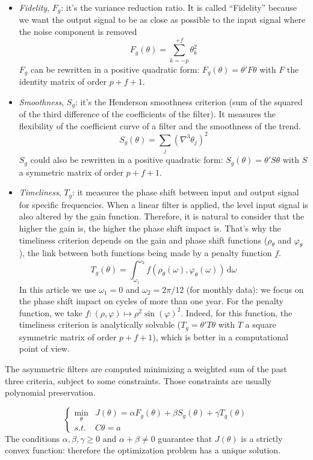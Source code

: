 \documentclass[
  12pt,
  ,
  a4paper]{article}
\newcommand\1{\mathds{1}}
\newcommand\ud{\,\mathrm{d}}
\begin{document}
\begin{itemize}
\item
  \emph{Fidelity}, \(F_g\): it's the variance reduction ratio. It is called ``Fidelity'' because we want the output signal to be as close as possible to the input signal where the noise component is removed
  \[
  F_g(\theta) = \sum_{k=-p}^{+f}\theta_{k}^{2}
  \]
  \(F_g\) can be rewritten in a positive quadratic form: \(F_g(\theta)=\theta'F\theta\) with \(F\) the identity matrix of order \(p+f+1\).
\item
  \emph{Smoothness}, \(S_g\): it's the Henderson smoothness criterion (sum of the squared of the third difference of the coefficients of the filter).
  It measures the flexibility of the coefficient curve of a filter and the smoothness of the trend.
  \[
  S_g(\theta) = \sum_{j}(\nabla^{3}\theta_{j})^{2}
  \]
  \(S_g\) could also be rewritten in a positive quadratic form: \(S_g(\theta)=\theta'S\theta\) with \(S\) a symmetric matrix of order \(p+f+1\).
\item
  \emph{Timeliness}, \(T_g\): it measures the phase shift between input and output signal for specific frequencies.
  When a linear filter is applied, the level input signal is also altered by the gain function.
  Therefore, it is natural to consider that the higher the gain is, the higher the phase shift impact is.
  That's why the timeliness criterion depends on the gain and phase shift functions (\(\rho_\theta\) and \(\varphi_{\theta}\)), the link between both functions being made by a penalty function \(f\).
  \[
  T_g(\theta)=\int_{\omega_{1}}^{\omega_{2}}f(\rho_{\theta}(\omega),\varphi_{\theta}(\omega))\ud\omega
  \]
  In this article we use \(\omega_1=0\) and \(\omega_2=2\pi/12\) (for monthly data): we focus on the phase shift impact on cycles of more than one year.
  For the penalty function, we take \(f\colon(\rho,\varphi)\mapsto\rho^2\sin(\varphi)^2\).
  Indeed, for this function, the timeliness criterion is analytically solvable (\(T_g=\theta'T\theta\) with \(T\) a square symmetric matrix of order \(p+f+1\)), which is better in a computational point of view.
\end{itemize}

The asymmetric filters are computed minimizing a weighted sum of the past three criteria, subject to some constraints. Those constraints are usually polynomial preservation.

\[
\begin{cases}
\underset{\theta}{\min} & J(\theta)=
\alpha F_g(\theta)+\beta S_g(\theta)+\gamma T_g(\theta)\\
s.t. & C\theta=a
\end{cases}
\]
The conditions \(\alpha,\beta,\gamma\geq 0\text{ and }\alpha+\beta\ne 0\) guarantee that \(J(\theta)\) is a strictly convex function: therefore the optimization problem has a unique solution.
\end{document}
